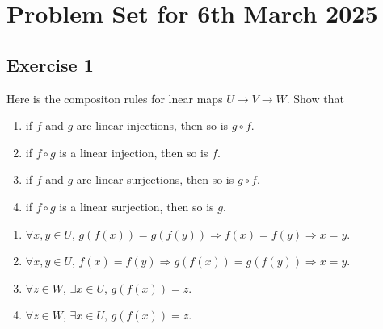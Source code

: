 \documentclass[11pt]{ctexart}
\theoremstyle{definition}
\numberwithin{equation}{section}
\theoremstyle{definition}
\theoremstyle{remark}
\begin{document}
\section{Problem Set for 6th March 2025}
\subsection{Exercise 1}
Here is the compositon rules for lnear maps $U \to V \to W$. Show that 
\begin{enumerate}
    \item if $f$ and $g$ are linear injections, then so is $g\circ f$.
    \item if $f \circ g$ is a linear injection, then so is $f$.
    \item if $f$ and $g$ are linear surjections, then so is $g\circ f$.
    \item if $f \circ g$ is a linear surjection, then so is $g$.
\end{enumerate}
\begin{aaa}
    \begin{enumerate}
        \item $\forall x,y\in U$, $g(f(x))=g(f(y))\Rightarrow f(x)=f(y)\Rightarrow x=y$.
        \item $\forall x,y\in U$, $f(x)=f(y)\Rightarrow g(f(x))=g(f(y))\Rightarrow x=y$.
        \item $\forall z\in W$, $\exists x\in U$, $g(f(x))=z$.
        \item $\forall z\in W$, $\exists x\in U$, $g(f(x))=z$.
    \end{enumerate}
\end{aaa}
\end{document}
